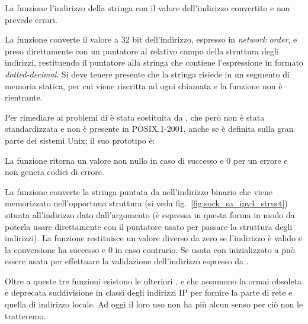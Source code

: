 \begin{funcproto}{
}

{La funzione l'indirizzo della stringa con il valore dell'indirizzo convertito
  e non prevede errori.}
\end{funcproto}

La funzione converte il valore a 32 bit dell'indirizzo, espresso in
\textit{network order}, e preso direttamente con un puntatore al relativo
campo della struttura degli indirizzi, restituendo il puntatore alla stringa
che contiene l'espressione in formato \textit{dotted-decimal}. Si deve tenere
presente che la stringa risiede in un segmento di memoria statica, per cui
viene riscritta ad ogni chiamata e la funzione non è rientrante.

Per rimediare ai problemi di  è stata sostituita da
, che però non è stata standardizzata e non è presente in
POSIX.1-2001, anche se è definita sulla gran parte dei sistemi Unix; il suo
prototipo è:

\begin{funcproto}{
}

{La funzione ritorna un valore non nullo in caso di successo e $0$ per un
  errore e non genera codici di errore.}
\end{funcproto}

La funzione converte la stringa puntata da  nell'indirizzo binario
che viene memorizzato nell'opportuna struttura  (si veda
fig.~\ref{fig:sock_sa_ipv4_struct}) situata all'indirizzo dato
dall'argomento  (è espressa in questa forma in modo da poterla
usare direttamente con il puntatore usato per passare la struttura degli
indirizzi). La funzione restituisce un valore diverso da zero se l'indirizzo è
valido e la conversione ha successo e 0 in caso contrario. Se usata
con  inizializzato a  può essere usata per effettuare la
validazione dell'indirizzo espresso da .

Oltre a queste tre funzioni esistono le ulteriori ,
 e  che assumono la ormai obsoleta e
deprecata suddivisione in classi degli indirizzi IP per fornire la parte di
rete e quella di indirizzo locale. Ad oggi il loro uso non ha più alcun senso
per ciò non le tratteremo.


